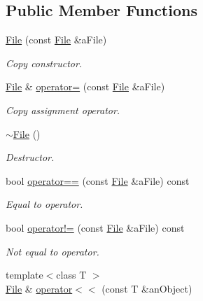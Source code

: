 \subsection*{Public Member Functions}
\begin{DoxyCompactItemize}
\item 
\hyperlink{classlibrary_1_1core_1_1fs_1_1_file_a6f3f0d79545ac9984c6f49432f0c6c39}{File} (const \hyperlink{classlibrary_1_1core_1_1fs_1_1_file}{File} \&a\+File)
\begin{DoxyCompactList}\small\item\em Copy constructor. \end{DoxyCompactList}\item 
\hyperlink{classlibrary_1_1core_1_1fs_1_1_file}{File} \& \hyperlink{classlibrary_1_1core_1_1fs_1_1_file_a8143d55e67cf2d6256c7653619a03909}{operator=} (const \hyperlink{classlibrary_1_1core_1_1fs_1_1_file}{File} \&a\+File)
\begin{DoxyCompactList}\small\item\em Copy assignment operator. \end{DoxyCompactList}\item 
\hyperlink{classlibrary_1_1core_1_1fs_1_1_file_aaea7205fab73035b6839b75395169d22}{$\sim$\+File} ()
\begin{DoxyCompactList}\small\item\em Destructor. \end{DoxyCompactList}\item 
bool \hyperlink{classlibrary_1_1core_1_1fs_1_1_file_a44ab79a23c5a129be298a026dbeec62f}{operator==} (const \hyperlink{classlibrary_1_1core_1_1fs_1_1_file}{File} \&a\+File) const
\begin{DoxyCompactList}\small\item\em Equal to operator. \end{DoxyCompactList}\item 
bool \hyperlink{classlibrary_1_1core_1_1fs_1_1_file_a0354b6dd59250c07cd5a8b679dc36d95}{operator!=} (const \hyperlink{classlibrary_1_1core_1_1fs_1_1_file}{File} \&a\+File) const
\begin{DoxyCompactList}\small\item\em Not equal to operator. \end{DoxyCompactList}\item 
{\footnotesize template$<$class T $>$ }\\\hyperlink{classlibrary_1_1core_1_1fs_1_1_file}{File} \& \hyperlink{classlibrary_1_1core_1_1fs_1_1_file_ad41b20bf5ad58a760115c43d8c84e130}{operator$<$$<$} (const T \&an\+Object)

\end{DoxyCompactItemize}
